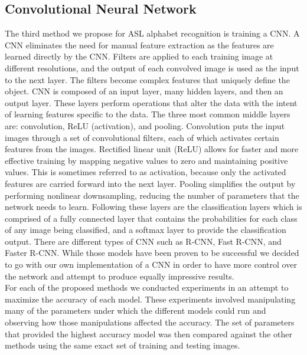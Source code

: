 \documentclass[conference]{IEEEtran}
\begin{document}
\subsection{Convolutional Neural Network}
The third method we propose for ASL alphabet recognition is training a CNN. A CNN eliminates the need for manual feature extraction as the features are learned directly by the CNN. Filters are applied to each training image at different resolutions, and the output of each convolved image is used as the input to the next layer. The filters become complex features that uniquely define the object. CNN is composed of an input layer, many hidden layers, and then an output layer. These layers perform operations that alter the data with the intent of learning features specific to the data. The three most common middle layers are: convolution, ReLU (activation), and pooling. Convolution puts the input images through a set of convolutional filters, each of which activates certain features from the images. Rectified linear unit (ReLU) allows for faster and more effective training by mapping negative values to zero and maintaining positive values. This is sometimes referred to as activation, because only the activated features are carried forward into the next layer. Pooling simplifies the output by performing nonlinear downsampling, reducing the number of parameters that the network needs to learn. Following these layers are the classification layers which is comprised of a fully connected layer that contains the probabilities for each class of any image being classified, and a softmax layer to provide the classification output. There are different types of CNN such as R-CNN, Fast R-CNN, and Faster R-CNN. While those models have been proven to be successful we decided to go with our own implementation of a CNN in order to have more control over the network and attempt to produce equally impressive results. \\

For each of the proposed methods we conducted experiments in an attempt to maximize the accuracy of each model. These experiments involved manipulating many of the parameters under which the different models could run and observing how those manipulations affected the accuracy. The set of parameters that provided the highest accuracy model was then compared against the other methods using the same exact set of training and testing images. 
\end{document}
